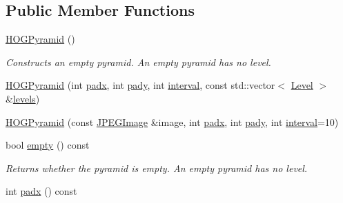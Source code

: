 \subsection*{Public Member Functions}
\begin{DoxyCompactItemize}
\item 
\hypertarget{class_f_f_l_d_1_1_h_o_g_pyramid_aab86c8da61b9ea188deab320c692a375}{\hyperlink{class_f_f_l_d_1_1_h_o_g_pyramid_aab86c8da61b9ea188deab320c692a375}{H\-O\-G\-Pyramid} ()}\label{class_f_f_l_d_1_1_h_o_g_pyramid_aab86c8da61b9ea188deab320c692a375}

\begin{DoxyCompactList}\small\item\em Constructs an empty pyramid. An empty pyramid has no level. \end{DoxyCompactList}\item 
\hyperlink{class_f_f_l_d_1_1_h_o_g_pyramid_a951d92ffa66b7e7d9d5fe44209fcaf26}{H\-O\-G\-Pyramid} (int \hyperlink{class_f_f_l_d_1_1_h_o_g_pyramid_aa8ed24222e8a5bd45374bc91451614cc}{padx}, int \hyperlink{class_f_f_l_d_1_1_h_o_g_pyramid_a4f29cae69e366eb3b5c36b0bdde6962f}{pady}, int \hyperlink{class_f_f_l_d_1_1_h_o_g_pyramid_a86c9ee51bac62aa0bd7fe8b29ad32cab}{interval}, const std\-::vector$<$ \hyperlink{class_f_f_l_d_1_1_h_o_g_pyramid_a1cd36670adf29538f44dfa434695ec34}{Level} $>$ \&\hyperlink{class_f_f_l_d_1_1_h_o_g_pyramid_ad43fe5cba5e0f23c0741a15b43da9079}{levels})
\item 
\hyperlink{class_f_f_l_d_1_1_h_o_g_pyramid_a64d8016358e951b1953cbcc8605c586f}{H\-O\-G\-Pyramid} (const \hyperlink{class_f_f_l_d_1_1_j_p_e_g_image}{J\-P\-E\-G\-Image} \&image, int \hyperlink{class_f_f_l_d_1_1_h_o_g_pyramid_aa8ed24222e8a5bd45374bc91451614cc}{padx}, int \hyperlink{class_f_f_l_d_1_1_h_o_g_pyramid_a4f29cae69e366eb3b5c36b0bdde6962f}{pady}, int \hyperlink{class_f_f_l_d_1_1_h_o_g_pyramid_a86c9ee51bac62aa0bd7fe8b29ad32cab}{interval}=10)
\item 
\hypertarget{class_f_f_l_d_1_1_h_o_g_pyramid_a5cb91dd6aee4788f68e25d565bca95de}{bool \hyperlink{class_f_f_l_d_1_1_h_o_g_pyramid_a5cb91dd6aee4788f68e25d565bca95de}{empty} () const }\label{class_f_f_l_d_1_1_h_o_g_pyramid_a5cb91dd6aee4788f68e25d565bca95de}

\begin{DoxyCompactList}\small\item\em Returns whether the pyramid is empty. An empty pyramid has no level. \end{DoxyCompactList}\item 
\hypertarget{class_f_f_l_d_1_1_h_o_g_pyramid_aa8ed24222e8a5bd45374bc91451614cc}{int \hyperlink{class_f_f_l_d_1_1_h_o_g_pyramid_aa8ed24222e8a5bd45374bc91451614cc}{padx} () const }\label{class_f_f_l_d_1_1_h_o_g_pyramid_aa8ed24222e8a5bd45374bc91451614cc}


\end{DoxyCompactItemize}
